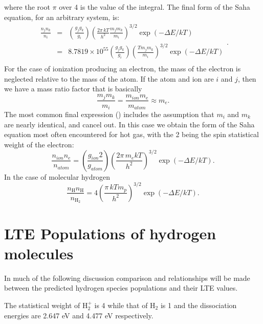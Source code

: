 where the root $\pi$ over 4 is the value of the integral.  The final form of
the Saha equation, for an arbitrary system, is:
\begin{equation}
\begin{array}{ccc}
 \frac{{{n_j}{n_k}}}{{{n_i}}}& =& \left( {\frac{{{g_j}{g_k}}}{{{g_i}}}}
\right){\left( {\frac{{2\pi \,kT}}{{{h^2}}}\frac{{{m_j}{m_k}}}{{{m_i}}}}
\right)^{3/2}}\exp \left( { - \Delta E/kT} \right) \\
&=& 8.7819 \times {10^{55}}\left( {\frac{{{g_j}{g_k}}}{{{g_i}}}}
\right){\left( {\frac{{T{m_j}{m_k}}}{{{m_i}}}} \right)^{3/2}}\exp \left(
{ - \Delta E/kT} \right) \\
 \end{array}.
\end{equation}
For the case of ionization producing an electron, the mass of the electron
is neglected relative to the mass of the atom.  If the atom and ion are
$i$ and $j$, then we have a mass ratio factor that is basically
\begin{equation}
\frac{{{m_j}{m_k}}}{{{m_i}}} = \frac{{{m_{ion}}{m_e}}}{{{m_{atom}}}}
\approx {m_e}.
\end{equation}
The most common final expression (\citealp{Mihalas1978}) includes the assumption
that $m_i$ and $m_k$ are nearly identical, and cancel out.   In this case we obtain
the form of the Saha equation most often encountered for hot gas, with the
2 being the spin statistical weight of the electron:
\begin{equation}
\frac{{{n_{ion}}{n_e}}}{{{n_{atom}}}} = \left(
{\frac{{{g_{ion}}2}}{{{g_{atom}}}}} \right){\left( {\frac{{2\pi
\,{m_e}kT}}{{{h^2}}}} \right)^{3/2}}\exp \left( { - \Delta E/kT} \right).
\end{equation}
In the case of molecular hydrogen
\begin{equation}
\frac{{{n_{\mathrm{H}}}{n_{\mathrm{H}}}}}{{{n_{{{\mathrm{H}}_{\mathrm{2}}}}}}} = 4{\left(
{\frac{{\pi \,kT{m_p}}}{{{h^2}}}} \right)^{3/2}}\exp \left( { - \Delta E/kT}
\right).
\end{equation}

\section{LTE Populations of hydrogen molecules}

In much of the following discussion comparison and relationships will
be made between the predicted hydrogen species populations and their LTE
values.

The statistical weight of H$_2^+$ is 4 while that of H$_2$ is 1 and the
dissociation energies are 2.647 eV and 4.477 eV respectively.

